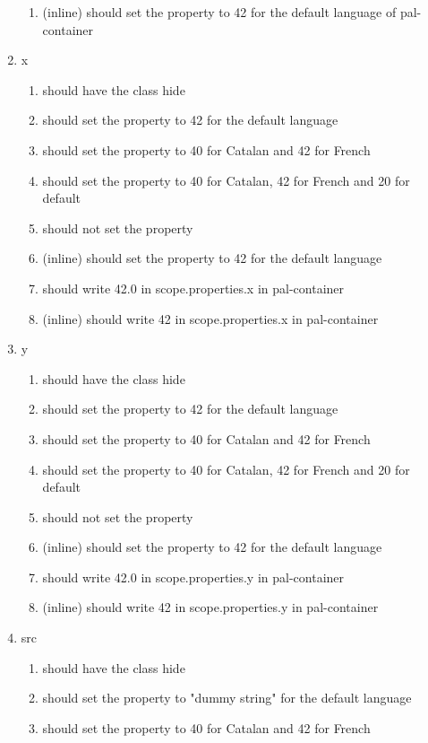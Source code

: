 \begin{singlespace}
\begin{enumerate}
\begin{enumerate}
\item         (inline) should set the property to 42 for the default language of pal-container
\end{enumerate}
\item     x
\begin{enumerate}
\item         should have the class hide
\item         should set the property to 42 for the default language
\item         should set the property to 40 for Catalan and 42 for French
\item         should set the property to 40 for Catalan, 42 for French and 20 for default
\item         should not set the property
\item         (inline) should set the property to 42 for the default language
\item         should write 42.0 in scope.properties.x in pal-container
\item         (inline) should write 42 in scope.properties.x in pal-container
\end{enumerate}
\item     y
\begin{enumerate}
\item         should have the class hide
\item         should set the property to 42 for the default language
\item         should set the property to 40 for Catalan and 42 for French
\item         should set the property to 40 for Catalan, 42 for French and 20 for default
\item         should not set the property
\item         (inline) should set the property to 42 for the default language
\item         should write 42.0 in scope.properties.y in pal-container
\item         (inline) should write 42 in scope.properties.y in pal-container
\end{enumerate}
\item     src
\begin{enumerate}
\item         should have the class hide
\item         should set the property to "dummy string" for the default language
\item         should set the property to 40 for Catalan and 42 for French

\end{enumerate}
\end{enumerate}
\end{singlespace}
